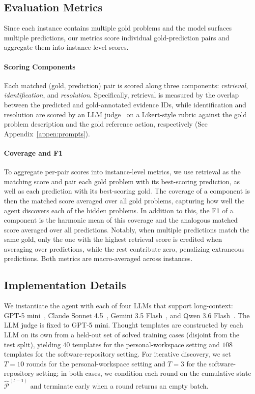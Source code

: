 \subsection{Evaluation Metrics}
Since each instance contains multiple gold problems and the model surfaces multiple predictions, our metrics score individual gold-prediction pairs and aggregate them into instance-level scores.

\paragraph{Scoring Components}
Each matched (gold, prediction) pair is scored along three components: \textit{retrieval}, \textit{identification}, and \textit{resolution}. Specifically, retrieval is measured by the overlap between the predicted and gold-annotated evidence IDs, while identification and resolution are scored by an LLM judge~\cite{geval} on a Likert-style rubric against the gold problem description and the gold reference action, respectively (See Appendix~\ref{appen:prompts}).

\paragraph{Coverage and F1}
To aggregate per-pair scores into instance-level metrics, we use retrieval as the matching score and pair each gold problem with its best-scoring prediction, as well as each prediction with its best-scoring gold. The coverage of a component is then the matched score averaged over all gold problems, capturing how well the agent discovers each of the hidden problems. In addition to this, the F1 of a component is the harmonic mean of this coverage and the analogous matched score averaged over all predictions. Notably, when multiple predictions match the same gold, only the one with the highest retrieval score is credited when averaging over predictions, while the rest contribute zero, penalizing extraneous predictions. Both metrics are macro-averaged across instances.

\subsection{Implementation Details}
We instantiate the agent with each of four LLMs that support long-context: GPT-5 mini~\cite{openai2025gpt5}, Claude Sonnet 4.5~\cite{anthropic2025sonnet45}, Gemini 3.5 Flash~\cite{google2026gemini35flash}, and Qwen 3.6 Flash~\cite{qwen2026qwen36}. The LLM judge is fixed to GPT-5 mini. Thought templates are constructed by each LLM on its own from a held-out set of solved training cases (disjoint from the test split), yielding $40$ templates for the personal-workspace setting and $108$ templates for the software-repository setting. For iterative discovery, we set $T=10$ rounds for the personal-workspace setting and $T=3$ for the software-repository setting; in both cases, we condition each round on the cumulative state $\hat{\mathcal{P}}^{(t-1)}$ and terminate early when a round returns an empty batch.
